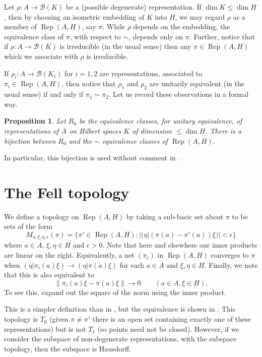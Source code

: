\documentclass[a4paper,11pt]{article}
\newcommand{\mc}[1]{{\mathcal{#1}}}
\newcommand{\Rep}{\operatorname{Rep}}
\newtheorem{proposition}[lemma]{Proposition}
\begin{document}
Let $\rho:A\rightarrow\mc B(K)$ be a (possible degenerate) representation.
If $\dim K \leq \dim H$, then by choosing an isometric embedding of $K$ into
$H$, we may regard $\rho$ as a member of $\Rep(A,H)$, say $\pi$.  While $\rho$ depends on the embedding, the equivalence class of $\pi$, with respect to
$\sim$, depends only on $\pi$.
Further, notice that if $\rho:A\rightarrow\mc B(K)$ is irreducible (in the
usual sense) then any $\pi\in\Rep(A,H)$ which we associate with $\rho$ is
irreducible.

If $\rho_i:A\rightarrow\mc B(K_i)$ for $i=1,2$ are representations,
associated to $\pi_i\in\Rep(A,H)$, then notice that $\rho_1$ and $\rho_2$
are unitarily equivalent (in the usual sense) if and only if $\pi_1\sim\pi_2$.
Let us record these observations in a formal way.

\begin{proposition}
Let $R_0$ be the equivalence classes, for unitary equivalence, of
representations of $A$ on Hilbert spaces $K$ of dimension $\leq\dim H$.
There is a bijection between $R_0$ and the $\sim$ equivalence classes of
$\Rep(A,H)$.
\end{proposition}

In particular, this bijection is used without comment in \cite[Section~2]{fell2}.


\section{The Fell topology}

We define a topology on $\Rep(A,H)$ by taking a sub-basic set about $\pi$
to be sets of the form
\[ M_{a,\xi,\eta,\epsilon}(\pi) =
\big\{ \pi'\in\Rep(A,H) : |(\eta|(\pi(a)-\pi'(a))\xi)|<\epsilon \big\} \]
where $a\in A$, $\xi,\eta\in H$ and $\epsilon>0$.  Note that here and elsewhere
our inner products are linear on the right.
Equivalently, a net $(\pi_i)$ in $\Rep(A,H)$ converges to $\pi$ when
$(\eta|\pi_i(a)\xi) \rightarrow (\eta|\pi(a)\xi)$ for each $a\in A$ and 
$\xi,\eta\in H$.  Finally, we note that this is also equivalent to
\[ \|\pi_i(a)\xi - \pi(a)\xi\| \rightarrow 0 \qquad (a\in A,\xi\in H). \]
To see this, expand out the square of the norm using the inner product.

This is a simpler definition than in \cite{fell1}, but the equivalence
is shown in \cite[page~239]{fell2}.  This topology is $T_0$ (given
$\pi\not=\pi'$ there is an open set containing exactly one of these
representations) but is not $T_1$ (so points need not be closed).  However,
if we consider the subspace of non-degenerate representations, with the
subspace topology, then the subspace is Hausdorff.
\end{document}
